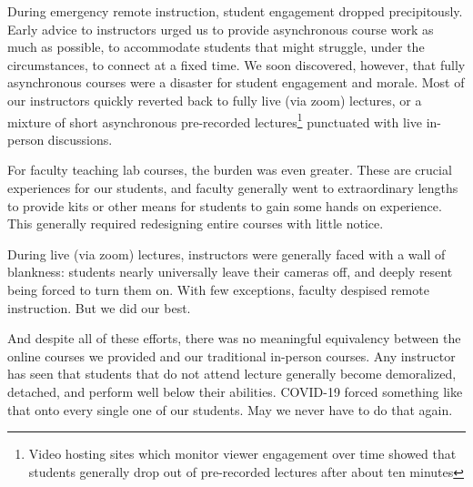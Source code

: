 \documentclass[12pt]{article}
\begin{document}
During emergency remote instruction, student engagement dropped
precipitously.  Early advice to instructors urged us to provide
asynchronous course work as much as possible, to accommodate students
that might struggle, under the circumstances, to connect at a fixed
time.  We soon discovered, however, that fully asynchronous courses
were a disaster for student engagement and morale.  Most of our instructors
quickly reverted back to fully live (via zoom) lectures, or a mixture of
short asynchronous pre-recorded lectures\footnote{Video hosting
  sites which monitor viewer engagement over time showed that students
  generally drop out of pre-recorded lectures after about ten minutes}
punctuated with live in-person discussions.

For faculty teaching lab courses, the burden was even greater.  These
are crucial experiences for our students, and faculty generally went
to extraordinary lengths to provide kits or other means for students
to gain some hands on experience.  This generally required redesigning
entire courses with little notice.

During live (via zoom) lectures, instructors were generally faced with
a wall of blankness: students nearly universally leave their cameras
off, and deeply resent being forced to turn them on.  With few
exceptions, faculty despised remote instruction.  But we did our best.

And despite all of these efforts, there was no meaningful equivalency
between the online courses we provided and our traditional in-person
courses.  Any instructor has seen that students that do not attend
lecture generally become demoralized, detached, and perform well below
their abilities.  COVID-19 forced something like that onto every
single one of our students.  May we never have to do that again.
\end{document}
